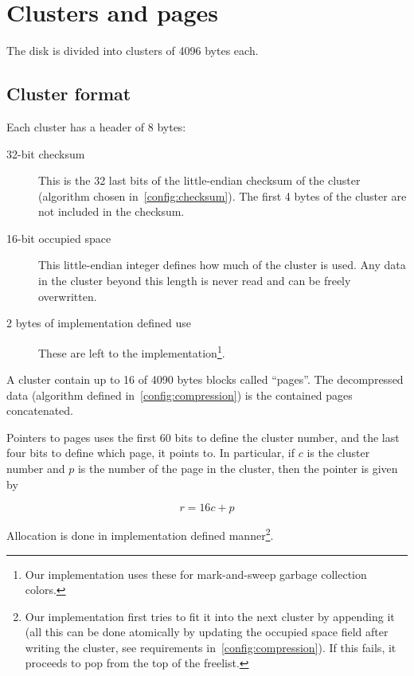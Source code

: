\documentclass[11pt,a4paper]{report}
\newcommand{\clusterheader}{8 }
\newcommand{\clustersize}{4096 }
\newcommand{\maxpagesincluster}{16 }
\newcommand{\pagesize}{4090 }
\begin{document}
    \section{Clusters and pages}
        The disk is divided into clusters of \clustersize bytes each.

        \subsection{Cluster format}
        Each cluster has a header of \clusterheader bytes:

        \begin{description}
            \item [32-bit checksum] This is the 32 last bits of the
                little-endian checksum of the cluster (algorithm
                chosen in~\ref{config:checksum}). The first 4 bytes of
                the cluster are not included in the checksum.
            \item [16-bit occupied space] This little-endian integer defines
                how much of the cluster is used. Any data in the cluster beyond
                this length is never read and can be freely overwritten.
            \item [2 bytes of implementation defined use] These are left to the
                implementation\footnote{Our implementation uses these for
                mark-and-sweep garbage collection colors.}.
        \end{description}

        A cluster contain up to \maxpagesincluster of \pagesize bytes blocks
        called ``pages''. The decompressed data (algorithm defined
        in~\ref{config:compression}) is the contained pages concatenated.

        Pointers to pages uses the first 60 bits to define the cluster number,
        and the last four bits to define which page, it points to. In
        particular, if $c$ is the cluster number and $p$ is the number of the
        page in the cluster, then the pointer is given by

        $$r = \maxpagesincluster c + p$$

        Allocation is done in implementation defined manner\footnote{Our
        implementation first tries to fit it into the next cluster by
        appending it (all this can be done atomically by updating the
        occupied space field after writing the cluster, see requirements
        in~\ref{config:compression}). If this fails, it proceeds to pop
        from the top of the freelist.}.
\end{document}
